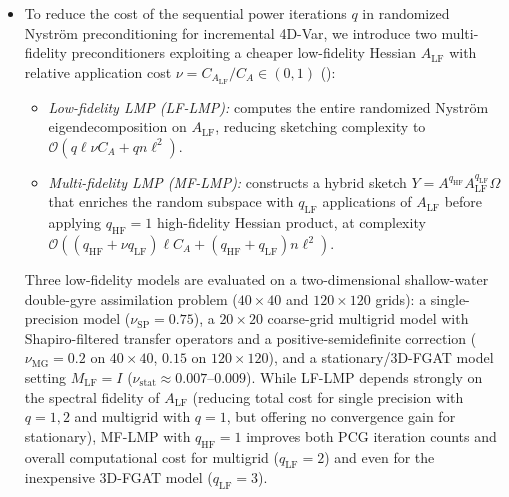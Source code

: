 \begin{itemize}
\item[T4.4] \label{sec:wp4:multifidelity}%
  To reduce the cost of the sequential power iterations $q$ in randomized
  Nyström preconditioning for incremental 4D-Var, we introduce two multi-fidelity
  preconditioners exploiting a cheaper low-fidelity Hessian $A_{\mathrm{LF}}$
  with relative application cost $\nu = C_{A_{\mathrm{LF}}}/C_A \in (0, 1)$
  ():
  \begin{itemize}
  \item \emph{Low-fidelity LMP (LF-LMP):} computes the entire randomized
    Nyström eigendecomposition on $A_{\mathrm{LF}}$, reducing sketching complexity
    to $\mathcal{O}(q\ell\nu C_A + qn\ell^2)$.
  \item \emph{Multi-fidelity LMP (MF-LMP):} constructs a hybrid sketch
    $Y = A^{q_{\mathrm{HF}}} A_{\mathrm{LF}}^{q_{\mathrm{LF}}} \Omega$ that
    enriches the random subspace with $q_{\mathrm{LF}}$ applications of
    $A_{\mathrm{LF}}$ before applying $q_{\mathrm{HF}} = 1$ high-fidelity
    Hessian product, at complexity
    $\mathcal{O}((q_{\mathrm{HF}} + \nu q_{\mathrm{LF}})\ell C_A + (q_{\mathrm{HF}} + q_{\mathrm{LF}})n\ell^2)$.
  \end{itemize}
  Three low-fidelity models are evaluated on a two-dimensional shallow-water
  double-gyre assimilation problem ($40 \times 40$ and $120 \times 120$ grids):
  a single-precision model ($\nu_{\mathrm{SP}} = 0.75$), a $20 \times 20$
  coarse-grid multigrid model with Shapiro-filtered transfer operators and a
  positive-semidefinite correction ($\nu_{\mathrm{MG}} = 0.2$ on $40 \times 40$,
  $0.15$ on $120 \times 120$), and a stationary/3D-FGAT model setting
  $M_{\mathrm{LF}} = I$ ($\nu_{\mathrm{stat}} \approx 0.007$--$0.009$).
  While LF-LMP depends strongly on the spectral fidelity of $A_{\mathrm{LF}}$
  (reducing total cost for single precision with $q = 1, 2$ and multigrid with
  $q = 1$, but offering no convergence gain for stationary), MF-LMP with
  $q_{\mathrm{HF}} = 1$ improves both PCG iteration counts and overall
  computational cost for multigrid ($q_{\mathrm{LF}} = 2$) and even for the
  inexpensive 3D-FGAT model ($q_{\mathrm{LF}} = 3$).


\end{itemize}
